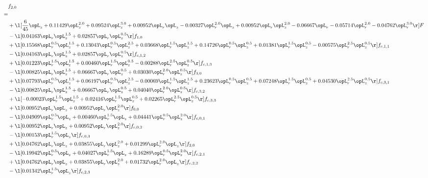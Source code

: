 \begin{alignat}{2} 
\label{eq:f_20_1} 
& f_{2,0} \nonumber \\ 
 = \\ 
& + \l[ \frac{6}{45} \opL_z +  0.11429 \opL_z^{2.0} +  0.09524 \opL_z^{3.0} +  0.00952 \opL_r \opL_z   -0.00327 \opL_r^{2.0} \opL_z +  0.00952 \opL_r \opL_z^{2.0}   -0.06667 \opL_r   -0.05714 \opL_r^{2.0}   -0.04762 \opL_r^{3.0}  \r] F \nonumber \\ 
& - \l[  0.04163 \opL_r \opL_z^{1.5} +  0.02857 \opL_r \opL_z^{0.5}  \r] f_{1,0} \nonumber \\ 
& + \l[  0.15568 \opL_r^{0.5} \opL_z^{1.5} +  0.13043 \opL_r^{0.5} \opL_z^{2.5} +  0.03668 \opL_r^{1.5} \opL_z^{1.5} +  0.14726 \opL_r^{0.5} \opL_z^{0.5} +  0.01381 \opL_r^{1.5} \opL_z^{0.5}   -0.00575 \opL_r^{2.5} \opL_z^{0.5}  \r] f_{c,1,1} \nonumber \\ 
& - \l[  0.04163 \opL_r \opL_z^{1.5} +  0.02857 \opL_r \opL_z^{0.5}  \r] f_{c,1,2} \nonumber \\ 
& + \l[  0.01223 \opL_r^{1.5} \opL_z^{1.5} +  0.00460 \opL_r^{1.5} \opL_z^{0.5}   -0.00288 \opL_r^{2.5} \opL_z^{0.5}  \r] f_{c,1,3} \nonumber \\ 
& - \l[  0.00825 \opL_r \opL_z^{1.5} +  0.06667 \opL_r \opL_z^{0.5} +  0.03030 \opL_r^{2.0} \opL_z^{0.5}  \r] f_{3,0} \nonumber \\ 
& + \l[  0.07793 \opL_r^{0.5} \opL_z^{1.5} +  0.06197 \opL_r^{0.5} \opL_z^{2.5}   -0.00069 \opL_r^{1.5} \opL_z^{1.5} +  0.23623 \opL_r^{0.5} \opL_z^{0.5} +  0.07248 \opL_r^{1.5} \opL_z^{0.5} +  0.04530 \opL_r^{2.5} \opL_z^{0.5}  \r] f_{c,3,1} \nonumber \\ 
& - \l[  0.00825 \opL_r \opL_z^{1.5} +  0.06667 \opL_r \opL_z^{0.5} +  0.04040 \opL_r^{2.0} \opL_z^{0.5}  \r] f_{c,3,2} \nonumber \\ 
& + \l[  -0.00023 \opL_r^{1.5} \opL_z^{1.5} +  0.02416 \opL_r^{1.5} \opL_z^{0.5} +  0.02265 \opL_r^{2.5} \opL_z^{0.5}  \r] f_{c,3,3} \nonumber \\ 
& + \l[  0.00952 \opL_r \opL_z +  0.00952 \opL_r \opL_z^{2.0}  \r] f_{0,0} \nonumber \\ 
& - \l[  0.04909 \opL_r^{0.5} \opL_z +  0.00460 \opL_r^{1.5} \opL_z +  0.04441 \opL_r^{0.5} \opL_z^{2.0}  \r] f_{c,0,1} \nonumber \\ 
& + \l[  0.00952 \opL_r \opL_z +  0.00952 \opL_r \opL_z^{2.0}  \r] f_{c,0,2} \nonumber \\ 
& - \l[  0.00153 \opL_r^{1.5} \opL_z  \r] f_{c,0,3} \nonumber \\ 
& + \l[  0.04762 \opL_r \opL_z +  0.03855 \opL_r \opL_z^{2.0} +  0.01299 \opL_r^{2.0} \opL_z  \r] f_{2,0} \nonumber \\ 
& - \l[  0.19942 \opL_r^{0.5} \opL_z +  0.04027 \opL_r^{1.5} \opL_z +  0.16289 \opL_r^{0.5} \opL_z^{2.0}  \r] f_{c,2,1} \nonumber \\ 
& + \l[  0.04762 \opL_r \opL_z +  0.03855 \opL_r \opL_z^{2.0} +  0.01732 \opL_r^{2.0} \opL_z  \r] f_{c,2,2} \nonumber \\ 
& - \l[  0.01342 \opL_r^{1.5} \opL_z  \r] f_{c,2,3} \nonumber \\ 
\end{alignat} 


